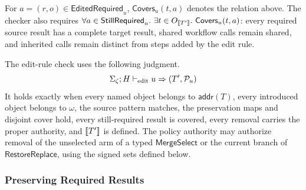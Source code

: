 For \(a=(r,o)\in\mathsf{EditedRequired}_u\), \(\mathsf{Covers}_u(t,a)\) denotes the relation above.
The checker also requires \(\forall a\in\mathsf{StillRequired}_u.\ \exists t\in O_{\mathopen{[\![}T'\mathclose{]\!]}}.\ \mathsf{Covers}_u(t,a)\): every required source result has a complete target result, shared workflow calls remain shared, and inherited calls remain distinct from steps added by the edit rule.

The edit-rule check uses the following judgment.
\[
\Sigma_\zeta;H\vdash_{\rm edit}u\Rightarrow(T',\mathcal P_u)
\]
It holds exactly when every named object belongs to \(\mathsf{addr}(T)\), every introduced object belongs to \(\omega\), the source pattern matches, the preservation maps and disjoint cover hold, every still-required result is covered, every removal carries the proper authority, and \(\mathopen{[\![}T'\mathclose{]\!]}\) is defined.
The policy authority may authorize removal of the unselected arm of a typed \(\mathsf{MergeSelect}\) or the current branch of \(\mathsf{RestoreReplace}\), using the signed sets defined below.
\subsubsection{Preserving Required Results}

